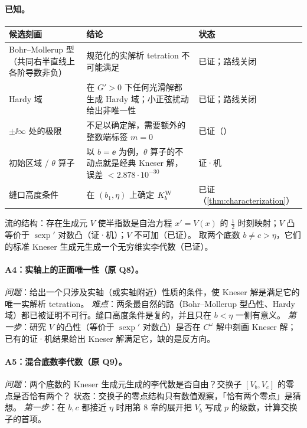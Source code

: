 \paragraph{已知。}
\begin{center}\small
\begin{tabular}{p{4.6cm}p{6.4cm}l}
\toprule
候选刻画 & 结论 & 状态\\
\midrule
Bohr--Mollerup 型（共同右半直线上各阶导数非负） & 规范化的实解析 tetration 不可能满足 & 已证；路线关闭\\
Hardy 域 & 在 $G'>0$ 下任何光滑解都生成 Hardy 域；小正弦扰动给出非唯一性 & 已证；路线关闭\\
$\pm\ii\infty$ 处的极限 & 不足以确定解，需要额外的整数端标签 $m=0$ & 已证（\cite[注~1.2]{KneserPaper}）\\
初始区域 / $\theta$ 算子 & 以 $b=\ee$ 为例，$\theta$ 算子的不动点就是经典 Kneser 解，误差 $<2.878\cdot10^{-30}$ & 证·机\\
缝口高度条件 & 在 $(b_1,\eta)$ 上确定 $K^{\mathrm W}_b$ & 已证（\cref{thm:characterization}）\\
\bottomrule
\end{tabular}
\end{center}
流的结构：存在生成元 $V$ 使半指数是自治方程 $x'=V(x)$ 的 $\tfrac12$ 时刻映射；$V$ 凸等价于 $\operatorname{sexp}'$ 对数凸（证·机）；$V$ 不可加（已证）。
取两个底数 $b\neq c>\eta$，它们的标准 Kneser 生成元生成一个无穷维实李代数（已证）。

\paragraph{A4：实轴上的正面唯一性（原 Q8）。}\emph{问题}：给出一个只涉及实轴（或实轴附近）性质的条件，使 Kneser 解是满足它的唯一实解析 tetration。
\emph{难点}：两条最自然的路（Bohr--Mollerup 型凸性、Hardy 域）都已被证明不可行。缝口高度条件是复的，并且只在 $b<\eta$ 一侧有意义。
\emph{第一步}：研究 $V$ 的凸性（等价于 $\operatorname{sexp}'$ 对数凸）是否在 $C^\omega$ 解中刻画 Kneser 解；已有的证·机结果给出 Kneser 解满足它，缺的是反方向。

\paragraph{A5：混合底数李代数（原 Q9）。}\emph{问题}：两个底数的 Kneser 生成元生成的李代数是否自由？交换子 $[V_b,V_c]$ 的零点是否恰有两个？
状态：交换子的零点结构只有数值观察，「恰有两个零点」是猜想。
\emph{第一步}：在 $b,c$ 都接近 $\eta$ 时用第 8 章的展开把 $V_b$ 写成 $p$ 的级数，计算交换子的首项。

